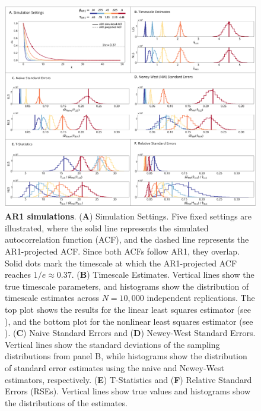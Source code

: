 \documentclass[latex/main.tex]{subfiles}
\begin{document}
\begin{figure}[H]
    \centering
    \includegraphics[width=1\textwidth]{latex/figures/fig01-ar1.png} 
    \caption{
    \textbf{AR1 simulations}.
    (\textbf{A}) Simulation Settings. Five fixed settings are illustrated, where the solid line represents the simulated autocorrelation function (ACF), and the dashed line represents the AR1-projected ACF. Since both ACFs follow AR1, they overlap. Solid dots mark the timescale at which the AR1-projected ACF reaches $1/e \approx 0.37$.
    (\textbf{B}) Timescale Estimates. Vertical lines show the true timescale parameters, and histograms show the distribution of timescale estimates across $N=10,000$ independent replications. The top plot shows the results for the linear least squares estimator (see ), and the bottom plot for the nonlinear least squares estimator (see ).
    (\textbf{C}) Naive Standard Errors and (\textbf{D}) Newey-West Standard Errors. Vertical lines show the standard deviations of the sampling distributions from panel B, while histograms show the distribution of standard error estimates using the naive and Newey-West estimators, respectively.
    (\textbf{E}) T-Statistics and (\textbf{F}) Relative Standard Errors (RSEs). Vertical lines show true values and histograms show the distributions of the estimates. 
    }
    \label{fig:sim-ar1}
\end{figure}
\end{document}
